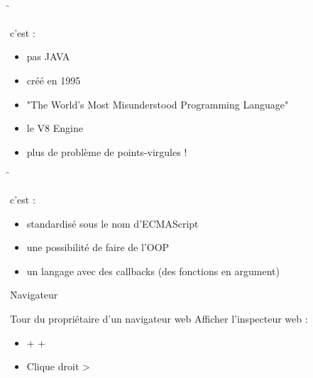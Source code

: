 \documentclass[12pt,aspectratio=169]{beamer}
\begin{document}
\fq

\section{\js}

\f{\js}{
\js c'est :
\begin{itemize}
    \item pas JAVA
    \item créé en 1995
    \item "The World's Most Misunderstood Programming Language" 
    \item le V8 \js Engine 
    \item plus de problème de points-virgules !
\end{itemize}
}

\f{\js}{
\js c'est :
\begin{itemize}
    \item standardisé sous le nom d'ECMAScript
    \item une possibilité de faire de l'OOP
    \item un langage avec des callbacks (des fonctions en argument)
\end{itemize}
}


\f{Navigateur}{
Tour du propriétaire d'un navigateur web
\newline
\newline
Afficher l'inspecteur web :
\begin{itemize}
    \item {} +  + 
    \item Clique droit > 
\end{itemize}
}


\end{document}
